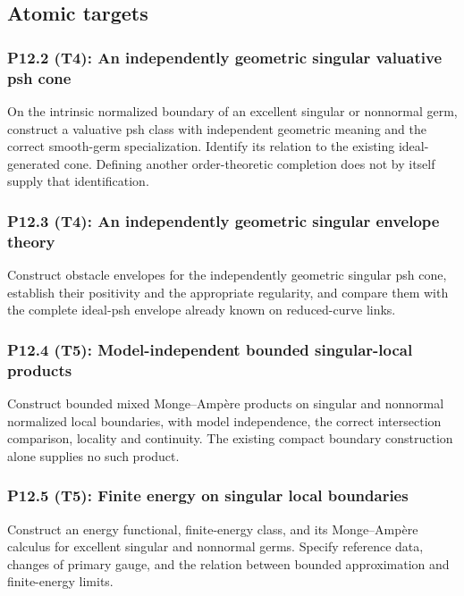 \documentclass[11pt,a4paper]{article}
\theoremstyle{definition}
\theoremstyle{remark}
\begin{document}
\subsection{Atomic targets}
\subsubsection*{P12.2 (T4): An independently geometric singular valuative psh cone}
\label{atom:P12.2}
On the intrinsic normalized boundary of an excellent singular or nonnormal germ, construct a valuative psh class with independent geometric meaning and the correct smooth-germ specialization. Identify its relation to the existing ideal-generated cone. Defining another order-theoretic completion does not by itself supply that identification.

\subsubsection*{P12.3 (T4): An independently geometric singular envelope theory}
\label{atom:P12.3}
Construct obstacle envelopes for the independently geometric singular psh cone, establish their positivity and the appropriate regularity, and compare them with the complete ideal-psh envelope already known on reduced-curve links.

\subsubsection*{P12.4 (T5): Model-independent bounded singular-local products}
\label{atom:P12.4}
Construct bounded mixed Monge--Ampère products on singular and nonnormal normalized local boundaries, with model independence, the correct intersection comparison, locality and continuity. The existing compact boundary construction alone supplies no such product.

\subsubsection*{P12.5 (T5): Finite energy on singular local boundaries}
\label{atom:P12.5}
Construct an energy functional, finite-energy class, and its Monge--Ampère calculus for excellent singular and nonnormal germs. Specify reference data, changes of primary gauge, and the relation between bounded approximation and finite-energy limits.
\end{document}
